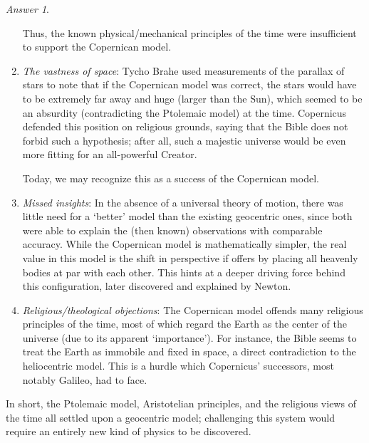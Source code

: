 \documentclass[11pt]{article}
\theoremstyle{remark}
\newtheorem*{answer}{Answer}
\begin{document}
\begin{answer}
\begin{enumerate}
            Thus, the known physical/mechanical principles of the time were
            insufficient to support the Copernican model.

            \item \emph{The vastness of space}: Tycho Brahe used measurements of the
            parallax of stars to note that if the Copernican model was correct, the
            stars would have to be extremely far away and huge (larger than the Sun),
            which seemed to be an absurdity (contradicting the Ptolemaic model) at
            the time. Copernicus defended this position on religious grounds, saying
            that the Bible does not forbid such a hypothesis; after all, such a
            majestic universe would be even more fitting for an all-powerful Creator.

            Today, we may recognize this as a success of the Copernican model.

            \item \emph{Missed insights}: In the absence of a universal
            theory of motion, there was little need for a `better' model than the
            existing geocentric ones, since both were able to explain the (then
            known) observations with comparable accuracy. While the Copernican model
            is mathematically simpler, the real value in this model is the shift in
            perspective if offers by placing all heavenly bodies at par with each
            other. This hints at a deeper driving force behind this configuration,
            later discovered and explained by Newton.

            \item \emph{Religious/theological objections}: The Copernican model
            offends many religious principles of the time, most of which regard the
            Earth as the center of the universe (due to its apparent `importance').
            For instance, the Bible seems to treat the Earth as immobile and fixed in
            space, a direct contradiction to the heliocentric model. This is a hurdle
            which Copernicus' successors, most notably Galileo, had to face.
        \end{enumerate}

        In short, the Ptolemaic model, Aristotelian principles, and the religious
        views of the time all settled upon a geocentric model; challenging this
        system would require an entirely new kind of physics to be discovered.
    \end{answer}
    
\end{document}
